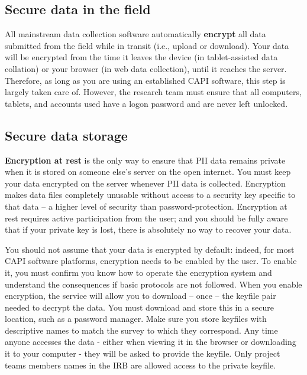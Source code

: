 {\subsection{Secure data in the field}
All mainstream data collection software automatically \textbf{encrypt}
all data submitted from the field while in transit (i.e., upload or download).  Your data will be encrypted from the time it leaves the device (in tablet-assisted data collation) or your browser (in web data collection), until it reaches the server. Therefore, as long as you are using an established CAPI software, this step is largely taken care of. However, the research team must ensure that all computers, tablets, and accounts used have a logon password and are never left unlocked. 

\subsection{Secure data storage}
\textbf{Encryption at rest} is the only way to ensure that PII data remains private when it is stored on someone else's server on the open internet. You must keep your data encrypted on the server whenever PII data is collected.
Encryption makes data files completely unusable without access to a security key specific to that data -- a higher level of security than password-protection. 
Encryption at rest requires active participation from the user; and you should be fully aware that if your private key is lost, there is absolutely no way to recover your data.

You should not assume that your data is encrypted by default: indeed, for most CAPI software platforms, encryption needs to be enabled by the user. 
To enable it, you must confirm you know how to operate the encryption system and understand the consequences if basic protocols are not followed.
When you enable encryption, the service will allow you to download -- once -- the keyfile pair needed to decrypt the data.
You must download and store this in a secure location, such as a password manager. Make sure you store keyfiles with descriptive names to match the survey to which they correspond.
Any time anyone accesses the data - either when viewing it in the browser or downloading it to your computer - they will be asked to provide the keyfile. 
Only project teams members names in the IRB are allowed access to the private keyfile. 

}
